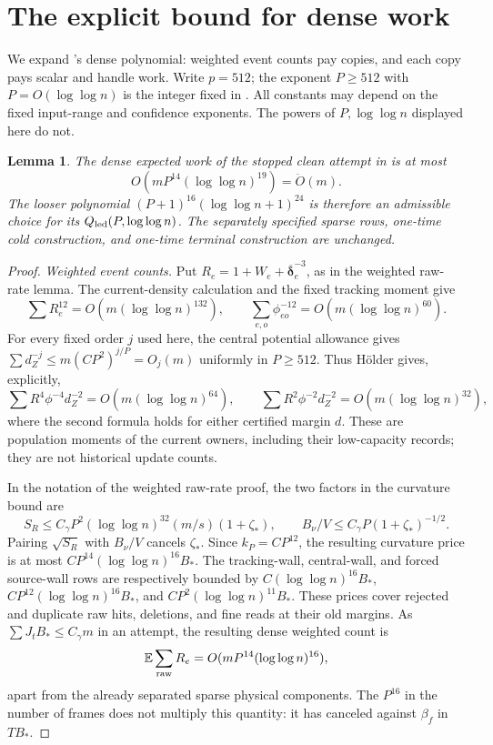 \documentclass[11pt]{article}
\newtheorem{lemma}[theorem]{Lemma}
\theoremstyle{remark}
\newcommand{\ddeltabar}{\overline{\boldsymbol{\delta}}}
\newcommand{\Ex}{\mathbb E}
\renewcommand{\O}{\ddot{O}}
\begin{document}
\section{The explicit bound for dense work}
\label{sec:ram27-explicit-ledger}

We expand 's dense polynomial: weighted event
counts pay copies, and each copy pays scalar and handle work.
Write $p=512$; the exponent $P\ge512$ with $P=O(\log\log n)$ is the integer
fixed in .
All constants may depend on the fixed input-range and confidence exponents.
The powers of $P,\log\log n$ displayed here do not.

\begin{lemma}
\label{prop:ram27-explicit-ledger}
The dense expected work of the stopped clean attempt in
 is at most
\[
O\left(mP^{14}(\log\log n)^{19}\right)=\O(m).
\]
The looser polynomial $(P+1)^{16}(\log\log n+1)^{24}$ is therefore an admissible
choice for its $Q_{\rm led}(P,\log\log n)$.
The separately specified sparse rows, one-time cold construction, and one-time
terminal construction are unchanged.
\end{lemma} \begin{proof} \emph{Weighted event counts.} Put
$R_e=1+W_e+\ddeltabar_e^{-3}$, as in the weighted raw-rate lemma.
The current-density calculation and the fixed tracking moment give
\[
 \sum R_e^{12}=O(m(\log\log n)^{132}),\qquad
 \sum_{e,o}\phi_{eo}^{-12}=O(m(\log\log n)^{60}).
\]
For every fixed order $j$ used here, the central potential allowance gives $\sum
d_Z^{-j}\le m(CP^2)^{j/P}=O_j(m)$ uniformly in $P\ge512$.
Thus H\"older gives, explicitly,
\[
 \sum R^4\phi^{-4}d_Z^{-2}=O(m(\log\log n)^{64}),\qquad
 \sum R^2\phi^{-2}d_Z^{-2}=O(m(\log\log n)^{32}),
\]
where the second formula holds for either certified margin $d$.
These are population moments of the current owners, including their low-capacity
records; they are not historical update counts.

In the notation of the weighted raw-rate proof, the two factors in the curvature
bound are
\[
 S_R\le C_\gamma P^2(\log\log n)^{32}(m/s)(1+\zeta_*),\qquad
 B_\nu/V\le C_\gamma P(1+\zeta_*)^{-1/2}.
\]
Pairing $\sqrt{S_R}$ with $B_\nu/V$ cancels $\zeta_*$.
Since $k_P=CP^{12}$, the resulting curvature price is at most
$CP^{14}(\log\log n)^{16}B_*$.
The tracking-wall, central-wall, and forced source-wall rows are respectively
bounded by $C(\log\log n)^{16}B_*$, $CP^{12}(\log\log n)^{16}B_*$, and $CP^2(\log\log n)^{11}B_*$.
These prices cover rejected and duplicate raw hits, deletions, and fine reads at
their old margins.
As $\sum J_tB_*\le C_\gamma m$ in an attempt, the resulting dense weighted count
is
\begin{equation}\label{eq:ram27-explicit-count}
 \Ex\sum_{\rm raw}R_e
                   =O(mP^{14}(\log\log n)^{16}),
\end{equation}
apart from the already separated sparse physical components.
The $P^{16}$ in the number of frames does not multiply this quantity: it has
canceled against $\beta_f$ in $TB_*$.


\end{proof}
\end{document}
